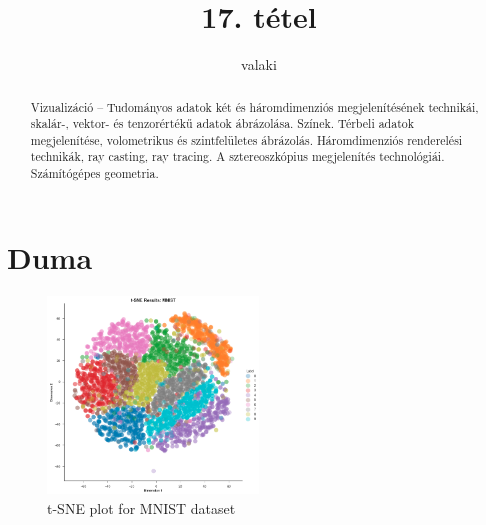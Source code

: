 \documentclass[12pt]{article}
\theoremstyle{plain}
\begin{document}
\title{17. tétel}
\author{valaki}

\maketitle


\newpage
\begin{abstract}
    Vizualizáció – Tudományos adatok két és háromdimenziós megjelenítésének technikái, skalár-, vektor- és tenzorértékű adatok ábrázolása. Színek. Térbeli adatok megjelenítése, volometrikus és szintfelületes ábrázolás. Háromdimenziós renderelési technikák, ray casting, ray tracing. A sztereoszkópius megjelenítés technológiái. Számítógépes geometria.
\end{abstract}

\section{Duma}
\begin{figure}[H]
    \begin{center}
    \includegraphics[width=0.5\textwidth]{media/tsneplot.png}
    \caption{t-SNE plot for MNIST dataset \cite{tsne-article}} 
    \label{fig:tsneplot}
    \end{center}
\end{figure}



\end{document}
